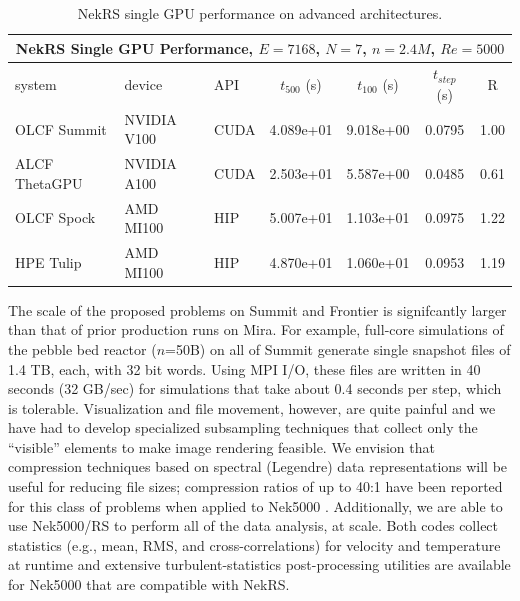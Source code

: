  \begin{table}[!t]
  \footnotesize
  \begin{center}
  \begin{tabular}{|l|l|l|c|c|c|c|}
  \hline
  \multicolumn{7}{|c|}{{\bf NekRS Single GPU Performance, $E=7168$, $N=7$, $n=2.4M$, $Re=5000$}} \\
  \hline
   system   & device &   API &  $t_{500}$ (s)    &   $t_{100}$  (s)  &   $t_{step}$ (s) & R \\
  \hline
    OLCF Summit   & NVIDIA V100  &  CUDA   &    4.089e+01  &  9.018e+00 &  0.0795 & 1.00   \\
    ALCF ThetaGPU & NVIDIA A100  &  CUDA   &    2.503e+01  &  5.587e+00 &  0.0485 & 0.61   \\
    OLCF Spock    & AMD MI100    &  HIP    &    5.007e+01  &  1.103e+01 &  0.0975 & 1.22   \\
    HPE Tulip     & AMD MI100    &  HIP    &    4.870e+01  &  1.060e+01 &  0.0953 & 1.19   \\
  \hline
  \end{tabular}
  \end{center}
  \caption{\small\label{singlerod} NekRS single GPU performance on advanced architectures.}
 \end{table}


The scale of the proposed problems on Summit and Frontier is signifcantly
larger than that of prior production runs on Mira.  For example, full-core
simulations of the pebble bed reactor  ($n$=50B) on all of Summit generate
single snapshot files of 1.4 TB, each, with 32 bit words.  Using MPI I/O, these
files are written in 40 seconds (32 GB/sec) for simulations that take about 0.4
seconds per step, which is tolerable.   Visualization and file movement,
however, are quite painful and we have had to develop specialized subsampling
techniques that collect only the ``visible'' elements to make image rendering
feasible.  We envision that compression techniques based on spectral (Legendre)
data representations will be useful for reducing file sizes; compression ratios
of up to 40:1 have been reported for this class of problems when applied to
Nek5000 \cite{otero18}.  Additionally, we are able to use Nek5000/RS to perform
all of the data analysis, at scale.  Both codes collect statistics (e.g., mean,
RMS, and cross-correlations) for velocity and temperature at runtime and
extensive turbulent-statistics post-processing utilities are available for
Nek5000 that are compatible with NekRS.


